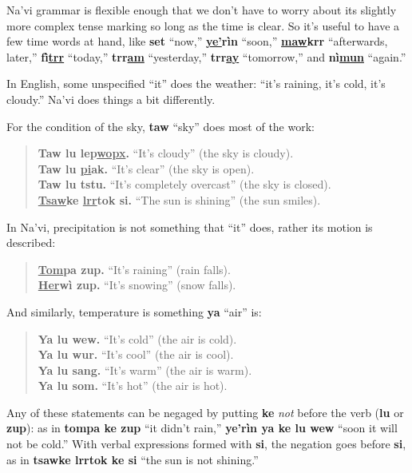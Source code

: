 \documentclass[nofonts]{tufte-handout}
\newcommand{\N}[1]{\textbf{\textcolor{navi}{#1}}}
\begin{document}
\bigskip
Na'vi grammar is flexible enough that we don't have to worry about its
slightly more complex tense marking so long as the time is clear.  So
it's useful to have a few time words at hand, like \N{set} ``now,''
\N{\uline{ye'}rìn} ``soon,'' \N{\uline{maw}krr} ``afterwards, later,''
\N{fì\uline{trr}} ``today,'' \N{trr\uline{am}} ``yesterday,''
\N{trr\uline{ay}} ``tomorrow,'' and \N{nì\uline{mun}} ``again.''

In English, some unspecified ``it'' does the weather: ``it's raining,
it's cold, it's cloudy.''  Na'vi does things a bit differently.

For the condition of the sky, \N{taw} ``sky'' does most of the work:

\begin{quotation}
\noindent\N{Taw lu lep\uline{wopx}.} ``It's cloudy'' (the sky is cloudy).\\
\noindent\N{Taw lu \uline{pi}ak.} ``It's clear'' (the sky is open). \\
\noindent\N{Taw lu tstu.} ``It's completely overcast'' (the sky is closed).\\
\noindent\N{\uline{Tsaw}ke \uline{lrr}tok si.} ``The sun is shining'' (the sun smiles).
\end{quotation}

In Na'vi, precipitation is not something that ``it'' does, rather its
motion is described: 

\begin{quotation}
\noindent\N{\uline{Tom}pa zup.} ``It's raining'' (rain falls).\\
\noindent\N{\uline{Her}wì zup.} ``It's snowing'' (snow falls).
\end{quotation}

And similarly, temperature is something \N{ya} ``air'' is:

\begin{quotation}
\noindent\N{Ya lu wew.} ``It's cold'' (the air is cold). \\
\noindent\N{Ya lu wur.} ``It's cool'' (the air is cool). \\
\noindent\N{Ya lu sang.} ``It's warm'' (the air is warm). \\
\noindent\N{Ya lu som.} ``It's hot'' (the air is hot).
\end{quotation}

Any of these statements can be negaged by putting \N{ke} \textit{not}
before the verb (\N{lu} or \N{zup}): as in \N{tompa ke zup} ``it
didn't rain,'' \N{ye'rìn ya ke lu wew} ``soon it will not be cold.''
With verbal expressions formed with \N{si}, the negation goes before
\N{si}, as in \N{tsawke lrrtok ke si} ``the sun is not shining.''
\end{document}
